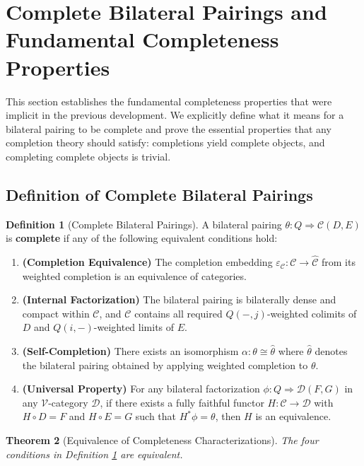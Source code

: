 \documentclass[11pt]{article}
\theoremstyle{plain}
\newtheorem{theorem}{Theorem}[section]
\theoremstyle{definition}
\newtheorem{definition}[theorem]{Definition}
\theoremstyle{remark}
\newcommand{\V}{\mathcal{V}}
\newcommand{\C}{\mathcal{C}}
\newcommand{\D}{\mathcal{D}}
\newcommand{\wh}[1]{\widehat{#1}}
\begin{document}
\section{Complete Bilateral Pairings and Fundamental Completeness Properties}

This section establishes the fundamental completeness properties that were implicit in the previous development. We explicitly define what it means for a bilateral pairing to be complete and prove the essential properties that any completion theory should satisfy: completions yield complete objects, and completing complete objects is trivial.

\subsection{Definition of Complete Bilateral Pairings}

\begin{definition}[Complete Bilateral Pairings]\label{def:complete-pairing}
A bilateral pairing $\theta : Q \Rightarrow \C(D, E)$ is \textbf{complete} if any of the following equivalent conditions hold:

\begin{enumerate}
\item \textbf{(Completion Equivalence)} The completion embedding $\varepsilon_\C : \C \to \wh{\C}$ from its weighted completion is an equivalence of categories.

\item \textbf{(Internal Factorization)} The bilateral pairing is bilaterally dense and compact within $\C$, and $\C$ contains all required $Q(-, j)$-weighted colimits of $D$ and $Q(i, -)$-weighted limits of $E$.

\item \textbf{(Self-Completion)} There exists an isomorphism $\alpha : \theta \cong \wh{\theta}$ where $\wh{\theta}$ denotes the bilateral pairing obtained by applying weighted completion to $\theta$.

\item \textbf{(Universal Property)} For any bilateral factorization $\phi : Q \Rightarrow \D(F, G)$ in any $\V$-category $\D$, if there exists a fully faithful functor $H : \C \to \D$ with $H \circ D = F$ and $H \circ E = G$ such that $H^* \phi = \theta$, then $H$ is an equivalence.
\end{enumerate}
\end{definition}

\begin{theorem}[Equivalence of Completeness Characterizations]\label{thm:completeness-equivalence}
The four conditions in Definition \ref{def:complete-pairing} are equivalent.
\end{theorem}
\end{document}
